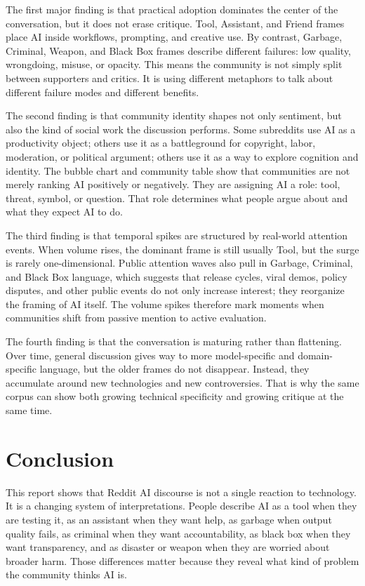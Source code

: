 \documentclass[11pt]{article}
\begin{document}
The first major finding is that practical adoption dominates the center of the conversation, but it does not erase critique. Tool, Assistant, and Friend frames place AI inside workflows, prompting, and creative use. By contrast, Garbage, Criminal, Weapon, and Black Box frames describe different failures: low quality, wrongdoing, misuse, or opacity. This means the community is not simply split between supporters and critics. It is using different metaphors to talk about different failure modes and different benefits.

The second finding is that community identity shapes not only sentiment, but also the kind of social work the discussion performs. Some subreddits use AI as a productivity object; others use it as a battleground for copyright, labor, moderation, or political argument; others use it as a way to explore cognition and identity. The bubble chart and community table show that communities are not merely ranking AI positively or negatively. They are assigning AI a role: tool, threat, symbol, or question. That role determines what people argue about and what they expect AI to do.

The third finding is that temporal spikes are structured by real-world attention events. When volume rises, the dominant frame is still usually Tool, but the surge is rarely one-dimensional. Public attention waves also pull in Garbage, Criminal, and Black Box language, which suggests that release cycles, viral demos, policy disputes, and other public events do not only increase interest; they reorganize the framing of AI itself. The volume spikes therefore mark moments when communities shift from passive mention to active evaluation.

The fourth finding is that the conversation is maturing rather than flattening. Over time, general discussion gives way to more model-specific and domain-specific language, but the older frames do not disappear. Instead, they accumulate around new technologies and new controversies. That is why the same corpus can show both growing technical specificity and growing critique at the same time.

\section{Conclusion}
This report shows that Reddit AI discourse is not a single reaction to technology. It is a changing system of interpretations. People describe AI as a tool when they are testing it, as an assistant when they want help, as garbage when output quality fails, as criminal when they want accountability, as black box when they want transparency, and as disaster or weapon when they are worried about broader harm. Those differences matter because they reveal what kind of problem the community thinks AI is.
\end{document}
